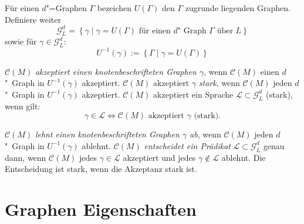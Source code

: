 \documentclass[11pt]{article}
\newcommand{\defWord}[1]{\emph{#1}}
\begin{document}
\begin{definition}
	Für einen $d$"=Graphen $\Gamma$ bezeichen $U(\Gamma)$ den $\Gamma$ zugrunde liegenden Graphen. 
	Definiere weiter 
	\begin{displaymath}
		\mathcal{G}_L^d = \left\{\gamma \mid \gamma = U(\Gamma) \text{ für einen $d$"~Graph } \Gamma \text{ über } L\right\}
	\end{displaymath} sowie für $\gamma \in \mathcal{G}_L^d :$
	\begin{displaymath}
		 U^{-1}(\gamma) := \left\{\Gamma \mid \gamma = U\left(\Gamma\right)\right\}
	\end{displaymath}
	
	$\mathcal{C}(M)$ \defWord{akzeptiert einen knotenbeschrifteten Graphen $\gamma$}, wenn $\mathcal{C}(M)$ einen $d$"~Graph in $U^{-1}(\gamma)$ akzeptiert.
	$\mathcal{C}(M)$ akzeptiert $\gamma$ \defWord{stark}, wenn $\mathcal{C}(M)$ jeden $d$"~Graph in $U^{-1}(\gamma)$ akzeptiert.
	$\mathcal{C}(M)$ akzeptiert ein Sprache $\mathcal{L} \subset \mathcal{G}_L^d$ (stark), wenn gilt: 
	\begin{displaymath}
		\gamma \in \mathcal{L} \iff \mathcal{C}\left(M\right) \text{ akzeptiert } \gamma \text{ (stark).}
	\end{displaymath} 
	
	$\mathcal{C}(M)$ \defWord{lehnt einen knotenbeschrifteten Graphen $\gamma$ ab}, wenn $\mathcal{C}(M)$ jeden $d$"~Graph in $U^{-1}(\gamma)$ ablehnt.
	$\mathcal{C}(M)$ \defWord{entscheidet ein Prädikat} $\mathcal{L} \subset \mathcal{G}_L^d$ genau dann, wenn $\mathcal{C}(M)$ jedes $\gamma \in \mathcal{L}$  akzeptiert und jedes $\gamma \notin \mathcal{L}$ ablehnt.
	Die Entscheidung ist stark, wenn die Akzeptanz stark ist. 
\end{definition}

\section{Graphen Eigenschaften}
\end{document}
